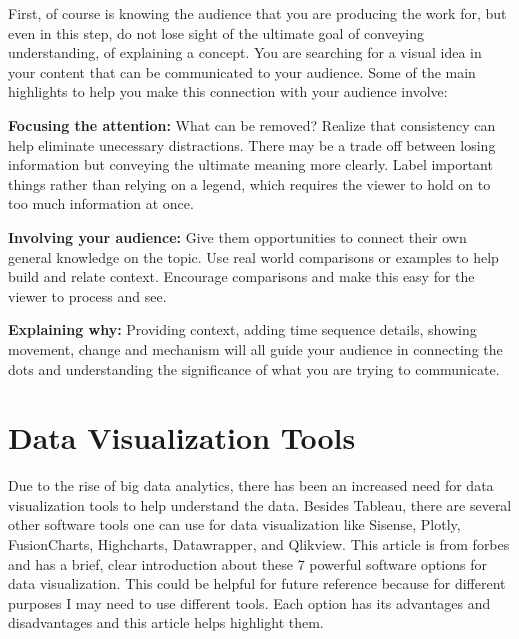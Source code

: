 \documentclass[]{book}
\theoremstyle{definition}
\theoremstyle{definition}
\theoremstyle{definition}
\theoremstyle{remark}
\begin{document}
First, of course is knowing the audience that you are producing the work
for, but even in this step, do not lose sight of the ultimate goal of
conveying understanding, of explaining a concept. You are searching for
a visual idea in your content that can be communicated to your audience.
Some of the main highlights to help you make this connection with your
audience involve:

\textbf{Focusing the attention:} What can be removed? Realize that
consistency can help eliminate unecessary distractions. There may be a
trade off between losing information but conveying the ultimate meaning
more clearly. Label important things rather than relying on a legend,
which requires the viewer to hold on to too much information at once.

\textbf{Involving your audience:} Give them opportunities to connect
their own general knowledge on the topic. Use real world comparisons or
examples to help build and relate context. Encourage comparisons and
make this easy for the viewer to process and see.

\textbf{Explaining why:} Providing context, adding time sequence
details, showing movement, change and mechanism will all guide your
audience in connecting the dots and understanding the significance of
what you are trying to communicate.

\section{Data Visualization Tools}\label{data-visualization-tools}

Due to the rise of big data analytics, there has been an increased need
for data visualization tools to help understand the data. Besides
Tableau, there are several other software tools one can use for data
visualization like Sisense, Plotly, FusionCharts, Highcharts,
Datawrapper, and Qlikview. This article is from forbes and has a brief,
clear introduction about these 7 powerful software options for data
visualization. This could be helpful for future reference because for
different purposes I may need to use different tools. Each option has
its advantages and disadvantages and this article helps highlight them.
\end{document}
